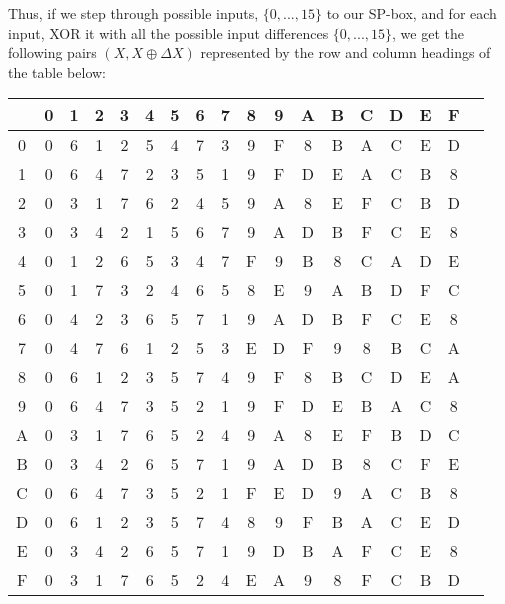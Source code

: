 Thus, if we step through possible inputs, $\{0, ..., 15\}$ to our SP-box, and for
each input, XOR it with all the possible input differences $\{0, ..., 15\}$, we
get the following pairs $(X, X \oplus \Delta X)$ represented by the row and
column headings of the table below:
\begin{center}
\begin{tabular}{|c||c|c|c|c|c|c|c|c|c|c|c|c|c|c|c|c|c|}
\hline
& 0 & 1 & 2 & 3 & 4 & 5 & 6 & 7 & 8 & 9 & A & B & C & D & E & F \\\hline\hline
0 & 0 & 6 & 1 & 2 & 5 & 4 & 7 & 3 & 9 & F & 8 & B & A & C & E & D \\\hline
1 & 0 & 6 & 4 & 7 & 2 & 3 & 5 & 1 & 9 & F & D & E & A & C & B & 8 \\\hline
2 & 0 & 3 & 1 & 7 & 6 & 2 & 4 & 5 & 9 & A & 8 & E & F & C & B & D \\\hline
3 & 0 & 3 & 4 & 2 & 1 & 5 & 6 & 7 & 9 & A & D & B & F & C & E & 8 \\\hline
4 & 0 & 1 & 2 & 6 & 5 & 3 & 4 & 7 & F & 9 & B & 8 & C & A & D & E \\\hline
5 & 0 & 1 & 7 & 3 & 2 & 4 & 6 & 5 & 8 & E & 9 & A & B & D & F & C \\\hline
6 & 0 & 4 & 2 & 3 & 6 & 5 & 7 & 1 & 9 & A & D & B & F & C & E & 8 \\\hline
7 & 0 & 4 & 7 & 6 & 1 & 2 & 5 & 3 & E & D & F & 9 & 8 & B & C & A \\\hline
8 & 0 & 6 & 1 & 2 & 3 & 5 & 7 & 4 & 9 & F & 8 & B & C & D & E & A \\\hline
9 & 0 & 6 & 4 & 7 & 3 & 5 & 2 & 1 & 9 & F & D & E & B & A & C & 8 \\\hline
A & 0 & 3 & 1 & 7 & 6 & 5 & 2 & 4 & 9 & A & 8 & E & F & B & D & C \\\hline
B & 0 & 3 & 4 & 2 & 6 & 5 & 7 & 1 & 9 & A & D & B & 8 & C & F & E \\\hline
C & 0 & 6 & 4 & 7 & 3 & 5 & 2 & 1 & F & E & D & 9 & A & C & B & 8 \\\hline
D & 0 & 6 & 1 & 2 & 3 & 5 & 7 & 4 & 8 & 9 & F & B & A & C & E & D \\\hline
E & 0 & 3 & 4 & 2 & 6 & 5 & 7 & 1 & 9 & D & B & A & F & C & E & 8 \\\hline
F & 0 & 3 & 1 & 7 & 6 & 5 & 2 & 4 & E & A & 9 & 8 & F & C & B & D \\\hline
\end{tabular}
\end{center}

